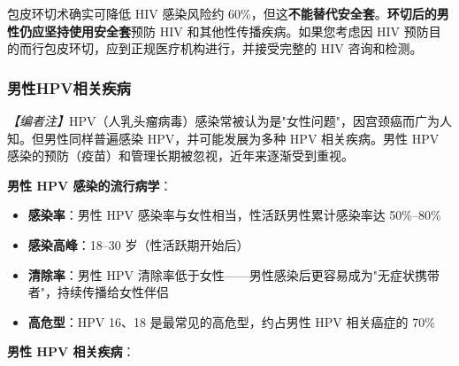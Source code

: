 \begin{tcolorbox}[colback=pink!5!white,colframe=red!50!black,title=贴心小叮咛]
包皮环切术确实可降低 HIV 感染风险约 60\%，但这\textbf{不能替代安全套}。\textbf{环切后的男性仍应坚持使用安全套}预防 HIV 和其他性传播疾病。如果您考虑因 HIV 预防目的而行包皮环切，应到正规医疗机构进行，并接受完整的 HIV 咨询和检测。
\end{tcolorbox}

\subsubsection{男性HPV相关疾病}
\label{subsec:male_hpv}

\noindent\textit{【编者注】}HPV（人乳头瘤病毒）感染常被认为是"女性问题"，因宫颈癌而广为人知。但男性同样普遍感染 HPV，并可能发展为多种 HPV 相关疾病。男性 HPV 感染的预防（疫苗）和管理长期被忽视，近年来逐渐受到重视。

\vspace{0.5em}
\noindent\textbf{男性 HPV 感染的流行病学}：

\begin{itemize}[leftmargin=2cm]
	\item \textbf{感染率}：男性 HPV 感染率与女性相当，性活跃男性累计感染率达 50\%--80\%
	\item \textbf{感染高峰}：18--30 岁（性活跃期开始后）
	\item \textbf{清除率}：男性 HPV 清除率低于女性——男性感染后更容易成为"无症状携带者"，持续传播给女性伴侣
	\item \textbf{高危型}：HPV 16、18 是最常见的高危型，约占男性 HPV 相关癌症的 70\%
\end{itemize}

\vspace{0.5em}
\noindent\textbf{男性 HPV 相关疾病}：

